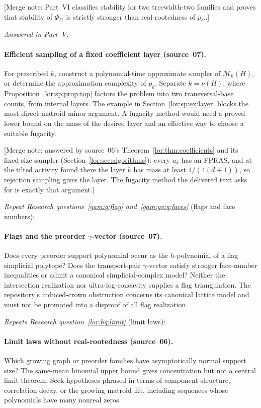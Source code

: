 \documentclass[11pt]{article}
\numberwithin{equation}{section}
\theoremstyle{definition}
\newcommand{\PM}{\mathcal M}
\begin{document}
[Merge note: Part~VI classifies stability for two treewidth-two families
and proves that stability of $\Phi_G$ is strictly stronger than
real-rootedness of $p_G$.]

\noindent\emph{Answered in Part~V:}
\paragraph{Efficient sampling of a fixed coefficient layer (source~07).}
For prescribed $k$, construct a polynomial-time approximate sampler of
$\PM_k(H)$, or determine the approximation complexity of $p_k$. Separate
$k=\nu(H)$, where Proposition~\ref{lor:sp:prop:top} factors the problem into two transversal-base
counts, from internal layers.
The example in Section~\ref{lor:sp:ex:layer} blocks the most direct matroid-minor argument.
A fugacity method would need a proved lower bound on the mass of the desired
layer and an effective way to choose a suitable fugacity.

[Merge note: answered by source~06's Theorem~\ref{lor:thm:coefficients}
and its fixed-size sampler (Section~\ref{lor:sec:algorithms}): every $a_k$ has
an FPRAS, and at the tilted activity found there the layer $k$ has mass at
least $1/(4(d+1))$, so rejection sampling gives the layer. The fugacity method
the delivered text asks for is exactly that argument.]

\noindent\emph{Repeat Research questions~\ref{gam:q:flag} and~\ref{gam:gv:q:faces}}
(flags and face numbers):
\paragraph{Flags and the preorder $\gamma$-vector (source~07).}
Does every preorder support polynomial occur as the $h$-polynomial of a flag
simplicial polytope? Does the transport-pair $\gamma$-vector satisfy stronger
face-number inequalities or admit a canonical simplicial-complex model?
Neither the intersection realization nor ultra-log-concavity supplies a flag
triangulation. The repository's induced-crown obstruction concerns its canonical
lattice model and must not be promoted into a disproof of all flag realization.


\noindent\emph{Repeats Research question~\ref{lor:hq:limit}} (limit laws):
\paragraph{Limit laws without real-rootedness (source~06).}
Which growing graph or preorder families have asymptotically normal
support size? The same-mean binomial upper bound gives concentration but
not a central limit theorem. Seek hypotheses phrased in terms of
component structure, correlation decay, or the growing matroid lift,
including sequences whose polynomials have many nonreal zeros.
\end{document}

